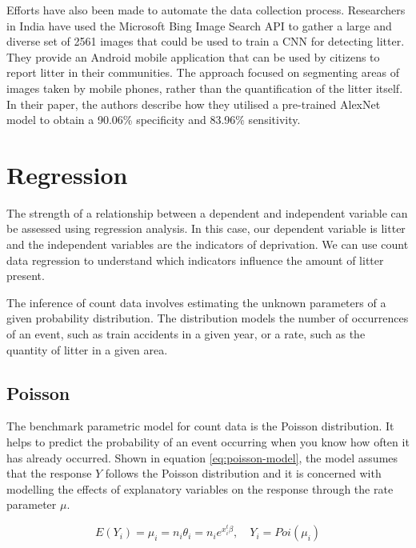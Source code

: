 \documentclass{thesis}
\begin{document}
Efforts have also been made to automate the data collection process. Researchers in India have used the Microsoft Bing Image Search API to gather a large and diverse set of 2561 images that could be used to train a CNN for detecting litter\cite{Mittal2016SpotGarbageSA}. They provide an Android mobile application that can be used by citizens to report litter in their communities. The approach focused on segmenting areas of images taken by mobile phones, rather than the quantification of the litter itself. In their paper, the authors describe how they utilised a pre-trained AlexNet\cite{NIPS2012_c399862d} model to obtain a 90.06\% specificity and 83.96\% sensitivity.

\section{Regression}

The strength of a relationship between a dependent and independent variable can be assessed using regression analysis. In this case, our dependent variable is litter and the independent variables are the indicators of deprivation. We can use count data regression to understand which indicators influence the amount of litter present.

The inference of count data involves estimating the unknown parameters of a given probability distribution. The distribution models the number of occurrences of an event, such as train accidents in a given year, or a rate, such as the quantity of litter in a given area.

\subsection{Poisson}

The benchmark parametric model for count data is the Poisson distribution\cite{cameron_trivedi_2013}. It helps to predict the probability of an event occurring when you know how often it has already occurred. Shown in equation \ref{eq:poisson-model}, the model assumes that the response $Y$ follows the Poisson distribution and it is concerned with modelling the effects of explanatory variables on the response through the rate parameter $\mu$. 

\begin{equation}
    E(Y_i) = \mu_i = n_i\theta_i = n_ie^{x_i^t\beta},\hspace{1em}Y_i = Poi(\mu_i)
    \label{eq:poisson-model}
\end{equation}
\end{document}
